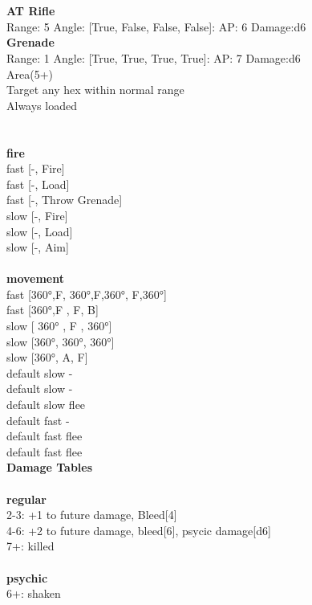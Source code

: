 \ \\

\ \\
{\bf AT Rifle } \\



Range: 5  Angle: [True, False, False, False]: AP: 6 Damage:d6 \\




{\bf Grenade } \\



Range: 1  Angle: [True, True, True, True]: AP: 7 Damage:d6 \\
Area(5+)\\ 
Target any hex within normal range\\ 
Always loaded\\ 




 
\ \\



\ \\ {\bf fire } \\
fast [-, Fire] \\
fast [-, Load] \\
fast [-, Throw Grenade] \\
slow [-, Fire] \\
slow [-, Load] \\
slow [-, Aim] \\
\ \\ {\bf movement } \\
fast [360°,F, 360°,F,360°, F,360°] \\
fast [360°,F , F, B] \\
slow [ 360° ,  F ,  360°] \\
slow [360°, 360°, 360°] \\
slow [360°, A, F] \\
default slow - \\
default slow - \\
default slow flee \\
default fast - \\
default fast flee \\
default fast flee \\


{\bf Damage Tables} \\
\ \\ {\bf regular } \\
2-3: +1 to future damage, Bleed[4] \\
4-6: +2 to future damage, bleed[6], psycic damage[d6] \\
7+: killed \\
\ \\ {\bf psychic } \\
6+: shaken \\










